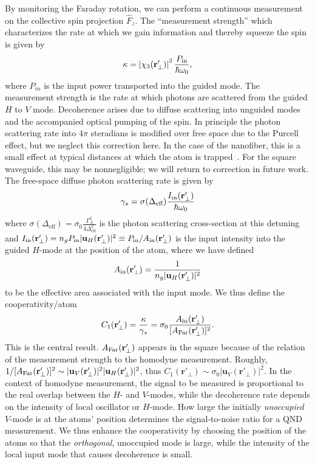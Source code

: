 \documentclass[preprint,aps,pra,onecolumn,superscriptaddress]{revtex4-1} %
\newcommand{\mbf}[1]{\mathbf{#1}}
\newcommand{\eff}{\text{eff}}
\newcommand{\AF}{A_{\rm Far}} %
\newcommand{\Ai}{A_{\rm in}} %
\begin{document}
By monitoring the Faraday rotation, we can perform a continuous measurement on the collective spin projection $\hat{F}_z$.  The ``measurement strength'' which characterizes the rate at which we gain information and thereby squeeze the spin is given by
\begin{equation}
\kappa = \left\vert \chi_3(\mbf{r}'_\perp) \right\vert^2 \frac{P_{\rm in}}{\hbar \omega_0},
\end{equation}
where $P_{in}$ is the input power transported into the guided mode.  The measurement strength is the rate at which photons are scattered from the guided $H$ to $V$ mode.  Decoherence arises due to diffuse scattering into unguided modes and the accompanied optical pumping of the spin.  In principle the photon scattering rate into $4\pi$ steradians is modified over free space due to the Purcell effect, but we neglect this correction here.  In the case of the nanofiber, this is a small effect at typical distances at which the atom is trapped~\cite{LeKien2005,Kien2008}.  For the square waveguide, this may be nonnegligible; we will return to correction in future work.  The free-space diffuse photon scattering rate is given by
\begin{equation}
\gamma_s = \sigma(\Delta_{\eff}) \frac{I_{\rm in}(\mbf{r}'_\perp)}{\hbar \omega_0}
\end{equation}
where $\sigma(\Delta_{\eff}) = \sigma_0 \frac{\Gamma_A^2}{4 \Delta^2_{\eff}}$ is the photon scattering cross-section at this detuning and  $I_{\rm in}(\mbf{r}'_\perp) = n_g P_{\rm in}\vert \mbf{u}_H (\mbf{r}'_\perp)  \vert^2 \equiv P_{\rm in}/\Ai(\mbf{r}'_\perp) $ is the input intensity into the guided $H$-mode at the position of the atom, where we have defined
\begin{equation}
\Ai(\mbf{r}'_\perp) =  \frac{1}{n_g \vert \mbf{u}_H (\mbf{r}'_\perp) \vert ^2}
\end{equation}
to be the effective area associated with the input mode.  We thus define the cooperativity/atom
\begin{equation}
C_1 (\mbf{r}'_\perp)  = \frac{\kappa}{\gamma_s} = \sigma_0 \frac{  \Ai(\mbf{r}'_\perp) }{[\AF(\mbf{r}'_\perp)]^2}.
\end{equation}
This is the central result.  $\AF(\mbf{r}'_\perp)$  appears in the square because of the relation of the measurement strength to the homodyne measurement.  Roughly, $1/[\AF(\mbf{r}'_\perp)]^2 \sim \vert \mbf{u}_V (\mbf{r}'_\perp) \vert ^2 \vert \mbf{u}_H (\mbf{r}'_\perp) \vert ^2$, thus $ C_1(\mbf{r}'_\perp) \sim \sigma_0 \vert \mbf{u}_V (\mbf{r}'_\perp) \vert ^2$. In the context of homodyne measurement, the signal to be measured is proportional to the real overlap between the $ H $- and $ V $-modes, while the decoherence rate depends on the intensity of local oscillator or $ H $-mode. How large the initially {\em unoccupied} $ V $-mode is at the atoms' position determines the signal-to-noise ratio for a QND measurement.  We thus enhance the cooperativity by choosing the position of the atoms so that the {\em orthogonal}, unoccupied mode is large, while the intensity of the local input mode that causes decoherence is small.
\end{document}
